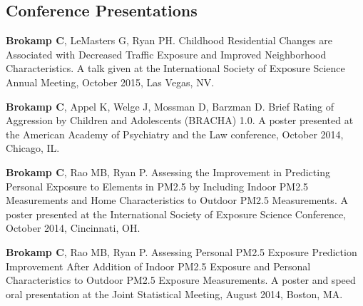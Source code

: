 \documentclass[margin,line]{res}
\newenvironment{list3}{
  \begin{list}{}{%
      \setlength{\itemsep}{0in}
      \setlength{\parsep}{0in} \setlength{\parskip}{0in}
      \setlength{\topsep}{0in} \setlength{\partopsep}{0in} 
      \setlength{\leftmargin}{0in}}}{\end{list}}
\begin{document}
\begin{resume}
\section{\sc Conference Presentations}
\begin{list3} \itemsep 4pt
\item[] \textbf{Brokamp C}, LeMasters G, Ryan PH. Childhood Residential Changes are Associated with Decreased Traffic Exposure and Improved Neighborhood Characteristics. A talk given at the International Society of Exposure Science Annual Meeting, October 2015, Las Vegas, NV.
\item[] \textbf{Brokamp C}, Appel K, Welge J, Mossman D, Barzman D. Brief Rating of Aggression by Children and Adolescents (BRACHA) 1.0.  A poster presented at the American Academy of Psychiatry and the Law conference, October 2014, Chicago, IL. 
\item[] \textbf{Brokamp C}, Rao MB, Ryan P. Assessing the Improvement in Predicting Personal Exposure to Elements in PM2.5 by Including Indoor PM2.5 Measurements and Home Characteristics to Outdoor PM2.5 Measurements.  A poster presented at the International Society of Exposure Science Conference, October 2014, Cincinnati, OH.
\item[] \textbf{Brokamp C}, Rao MB, Ryan P. Assessing Personal PM2.5 Exposure Prediction Improvement After Addition of Indoor PM2.5 Exposure and Personal Characteristics to Outdoor PM2.5 Exposure Measurements. A poster and speed oral presentation at the Joint Statistical Meeting, August 2014, Boston, MA.

\end{list3}
\end{resume}
\end{document}
